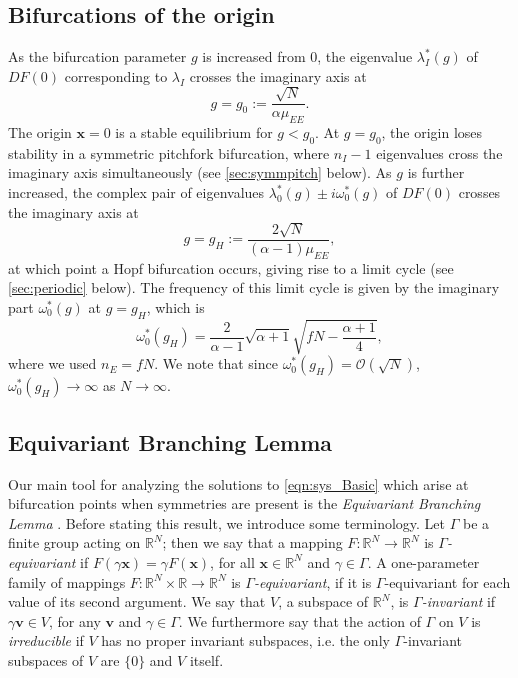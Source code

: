 \documentclass[reqno]{siamonline190516}
\newcommand{\vvec}{\mathbf{v}}
\newcommand{\xvec}{\mathbf{x}}
\begin{document}
\subsection{Bifurcations of the origin}\label{sec:biforigin}

As the bifurcation parameter $g$ is increased from 0, the eigenvalue $\lambda_I^*(g)$ of $DF(0)$ corresponding to $\lambda_I$ crosses the imaginary axis at
\begin{equation}\label{eq:pitchlocation}
    g = g_0 := \frac{\sqrt{N}}{\alpha \mu_{EE}}.
\end{equation}
The origin $\xvec = 0$ is a stable equilibrium for $g < g_0$. At $g=g_0$, the origin loses stability in a symmetric pitchfork bifurcation, where $n_I - 1$ eigenvalues cross the imaginary axis simultaneously (see \cref{sec:symmpitch} below). As $g$ is further increased, the complex pair of eigenvalues $\lambda^*_0(g) \pm i \omega^*_0(g)$ of $DF(0)$ crosses the imaginary axis at 
\begin{equation}\label{eq:0hopflocation}
    g = g_H := \frac{ 2\sqrt{N} }{ (\alpha-1)\mu_{EE} },
\end{equation}
at which point a Hopf bifurcation occurs, giving rise to a limit cycle (see \cref{sec:periodic} below). The frequency of this limit cycle is given by the imaginary part $\omega^*_0(g)$ at $g = g_H$, which is
\begin{equation}\label{eq:omegag}
\omega^*_0(g_H) = \frac{2}{\alpha-1}\sqrt{\alpha+1}\sqrt{f N- \frac{\alpha+1}{4}}, 
\end{equation}
where we used $n_E = f N$. We note that since $\omega^*_0(g_H) = \mathcal{O}(\sqrt{N})$, $\omega^*_0(g_H) \rightarrow \infty$ as $N \rightarrow \infty$. 

\subsection{Equivariant Branching Lemma}\label{sec:EBL}

Our main tool for analyzing the solutions to \cref{eqn:sys_Basic} which arise at bifurcation points when symmetries are present is the \emph{Equivariant Branching Lemma} \cite{Golubitsky2002,MR631456,GSS88Vol2,HoyleRebeccaB2006Pf:a}. Before stating this result, we introduce some terminology. Let $\Gamma$ be a finite group acting on $\mathbb{R}^N$; then we say that a mapping $F: \mathbb{R}^N  \rightarrow \mathbb{R}^N$ is \emph{$\Gamma$-equivariant} if $F(\gamma \xvec) = \gamma F(\xvec)$, for all $\xvec \in \mathbb{R}^N$ and $\gamma \in \Gamma$.  A one-parameter family of mappings $F: \mathbb{R}^N \times \mathbb{R}  \rightarrow \mathbb{R}^N$ is \emph{$\Gamma$-equivariant}, if it is $\Gamma$-equivariant for each value of its second argument. We say that $V$, a subspace of $\mathbb{R}^N$, is \emph{$\Gamma$-invariant} if $\gamma \vvec \in V$, for any $\vvec$ and $\gamma \in \Gamma$. We furthermore say that the action of $\Gamma$ on $V$ is \emph{irreducible} if $V$ has no proper invariant subspaces, i.e. the only $\Gamma$-invariant subspaces of $V$ are $\{0\}$ and $V$ itself. 
\end{document}
